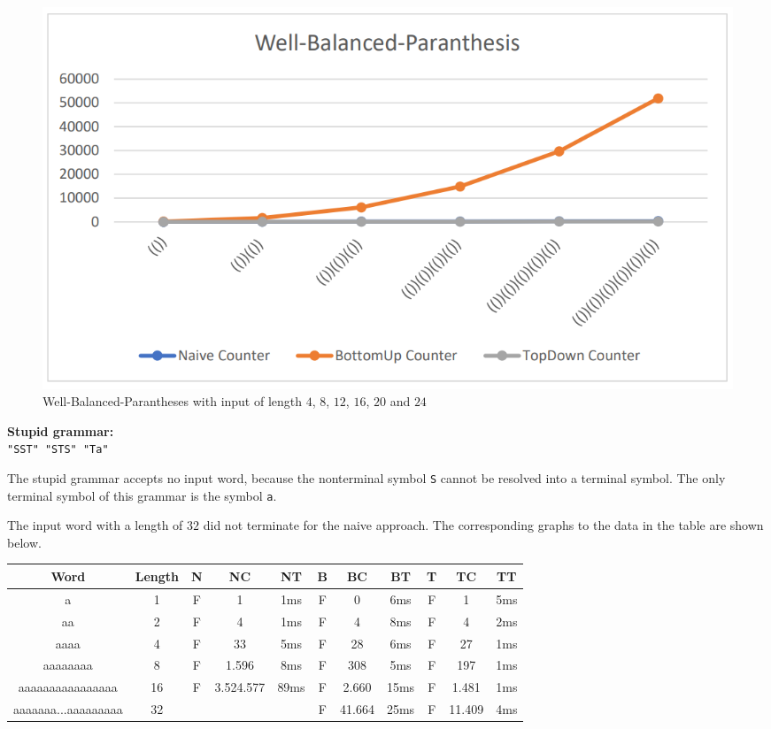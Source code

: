 \documentclass[a4paper, 11pt]{article}
\begin{document}
\begin{figure}[H]
\begin{center}
\includegraphics[scale=0.4]{diagrams/BP_C.png}
\end{center}
\caption{Well-Balanced-Parantheses with input of length $4$, $8$, $12$, $16$, $20$ and $24$ }
\end{figure}



\textbf{Stupid grammar:} \\
\texttt{"SST" "STS" "Ta"}

The stupid grammar accepts no input word, because the nonterminal symbol \texttt{S} cannot be resolved into a terminal symbol. The only terminal symbol of this grammar is the symbol \texttt{a}.

The input word with a length of $32$ did not terminate for the naive approach. The corresponding graphs to the data in the table are shown below.

\begin{tabular}{|c|c||c|c|c||c|c|c||c|c|c|}
\hline
Word & Length & N & NC & NT & B & BC & BT & T & TC & TT \\
\hline
\hline
a & 1 & F & 1 & 1ms & F & 0 & 6ms & F & 1 & 5ms \\
\hline
aa & 2 & F & 4 & 1ms & F & 4 & 8ms & F & 4 & 2ms \\
\hline
aaaa & 4 & F & 33 & 5ms & F & 28 & 6ms & F &27 & 1ms \\
\hline
aaaaaaaa & 8 & F & 1.596 & 8ms & F & 308 & 5ms & F & 197 & 1ms \\
\hline
aaaaaaaaaaaaaaaa & 16 & F & 3.524.577 & 89ms & F & 2.660 & 15ms & F & 1.481 & 1ms \\
\hline
aaaaaaa...aaaaaaaaa & 32 &  & & & F & 41.664 & 25ms & F & 11.409 & 4ms \\
\hline
\end{tabular}
\end{document}
